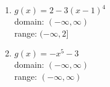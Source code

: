 \documentclass{ximera}
\begin{document}
\begin{enumerate}
\setcounter{enumi}{\value{HW}}


\item $g(x) = 2 - 3(x - 1)^{4}$\\
domain: $(-\infty, \infty)$\\
range: $(-\infty, 2]$\\

%


\vfill


\item $g(x) = -x^{5} - 3$\\
domain: $(-\infty, \infty)$\\
range: $(-\infty, \infty)$\\

%


\setcounter{HW}{\value{enumi}}
\end{enumerate}


\pagebreak
\end{document}
